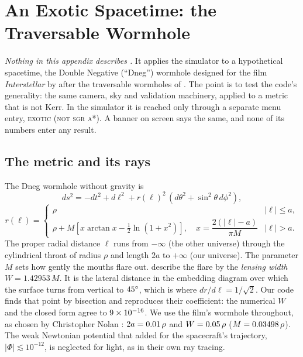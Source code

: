 \chapter{An Exotic Spacetime: the Traversable Wormhole}
\label{app:xwormhole}

\emph{Nothing in this appendix describes \sgra.} It applies the simulator to
a hypothetical spacetime, the Double Negative (``Dneg'') wormhole designed for
the film \emph{Interstellar} by \citet{James2015wormhole} after the
traversable wormholes of \citet{MorrisThorne1988}. The point is to test the
code's generality: the same camera, sky and validation machinery, applied to a
metric that is not Kerr. In the simulator it is reached only through a
separate menu entry, \textsc{exotic (not sgr a*)}. A banner on screen says the
same, and none of its numbers enter any \sgra{} result.

\section{The metric and its rays}

The Dneg wormhole without gravity \citep[][eqs.~1 and 5]{James2015wormhole}
is
\begin{equation}
ds^2 = -dt^2 + d\ell^2 + r(\ell)^2\,(d\theta^2 + \sin^2\theta\,d\phi^2),
\label{eq:dneg}
\end{equation}
\begin{equation}
r(\ell) = \begin{cases}
\rho & |\ell| \le a, \\[2pt]
\rho + M\left[x \arctan x - \tfrac12 \ln(1 + x^2)\right],
\quad x = \dfrac{2(|\ell| - a)}{\pi M} & |\ell| > a .
\end{cases}
\end{equation}
The proper radial distance $\ell$ runs from $-\infty$ (the other universe)
through the cylindrical throat of radius $\rho$ and length $2a$ to $+\infty$
(our universe). The parameter $M$ sets how gently the mouths flare out.
\citet{James2015wormhole} describe the flare by the \emph{lensing width}
$W = 1.42953\,M$. It is the lateral distance in the embedding diagram over
which the surface turns from vertical to $45^\circ$, which is where
$dr/d\ell = 1/\sqrt2$. Our code finds that point by bisection and reproduces
their coefficient: the numerical $W$ and the closed form agree to
$9\times10^{-16}$. We use the film's wormhole throughout, as chosen by Christopher
Nolan \citep{James2015wormhole}: $2a = 0.01\,\rho$ and $W = 0.05\,\rho$
($M = 0.03498\,\rho$). The weak Newtonian potential that \citet{James2015wormhole}
added for the spacecraft's trajectory, $|\Phi| \lesssim 10^{-12}$, is
neglected for light, as in their own ray tracing.

